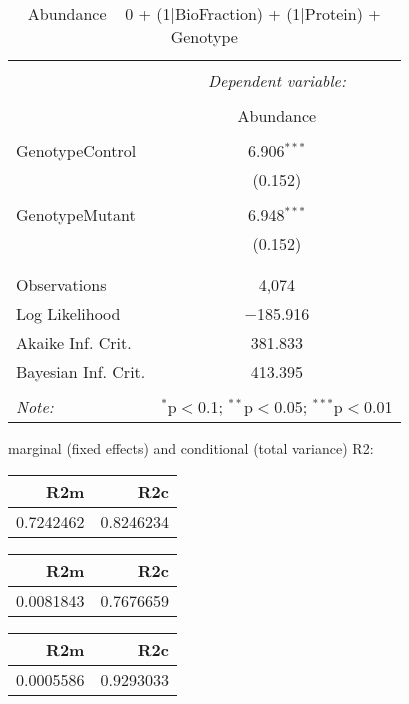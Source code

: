 \documentclass[11pt]{report}
\begin{document}
\begin{table}[!htbp] \centering 
  \caption{Abundance ~ 0 + (1|BioFraction) + (1|Protein) + Genotype} 
  \label{} 
\begin{tabular}{@{\extracolsep{5pt}}lc} 
\\[-1.8ex]\hline 
\hline \\[-1.8ex] 
 & \multicolumn{1}{c}{\textit{Dependent variable:}} \\ 
\cline{2-2} 
\\[-1.8ex] & Abundance \\ 
\hline \\[-1.8ex] 
 GenotypeControl & 6.906$^{***}$ \\ 
  & (0.152) \\ 
  & \\ 
 GenotypeMutant & 6.948$^{***}$ \\ 
  & (0.152) \\ 
  & \\ 
\hline \\[-1.8ex] 
Observations & 4,074 \\ 
Log Likelihood & $-$185.916 \\ 
Akaike Inf. Crit. & 381.833 \\ 
Bayesian Inf. Crit. & 413.395 \\ 
\hline 
\hline \\[-1.8ex] 
\textit{Note:}  & \multicolumn{1}{r}{$^{*}$p$<$0.1; $^{**}$p$<$0.05; $^{***}$p$<$0.01} \\ 
\end{tabular} 
\end{table} 
marginal (fixed effects) and conditional (total variance) R2:

\begin{tabular}{r|r}
\hline
R2m & R2c\\
\hline
0.7242462 & 0.8246234\\
\hline
\end{tabular}

\begin{tabular}{r|r}
\hline
R2m & R2c\\
\hline
0.0081843 & 0.7676659\\
\hline
\end{tabular}

\begin{tabular}{r|r}
\hline
R2m & R2c\\
\hline
0.0005586 & 0.9293033\\
\hline
\end{tabular}
\end{document}
